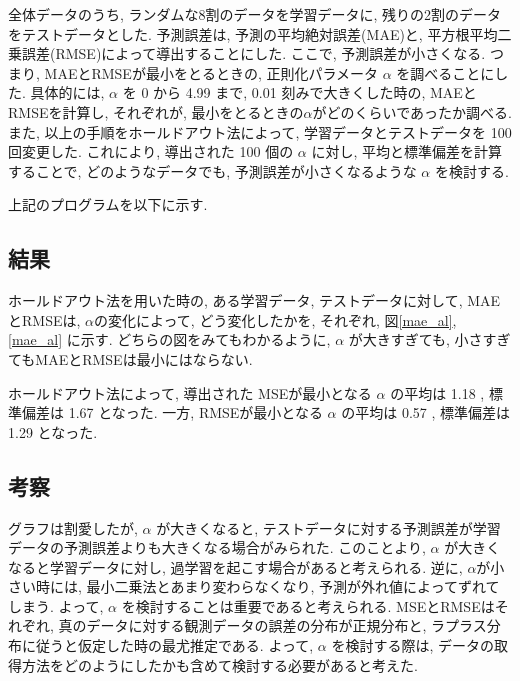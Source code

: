\documentclass{jsarticle}
\begin{document}
全体データのうち, ランダムな8割のデータを学習データに, 残りの2割のデータをテストデータとした.
予測誤差は, 予測の平均絶対誤差(MAE)と, 平方根平均二乗誤差(RMSE)によって導出することにした.
ここで, 予測誤差が小さくなる. つまり, MAEとRMSEが最小をとるときの, 正則化パラメータ $\alpha$ を調べることにした.
具体的には, $\alpha$ を 0 から 4.99 まで, 0.01 刻みで大きくした時の, MAEとRMSEを計算し, それぞれが, 最小をとるときの$\alpha$がどのくらいであったか調べる.
また, 以上の手順をホールドアウト法によって, 学習データとテストデータを 100 回変更した.
これにより, 導出された 100 個の $\alpha$ に対し, 平均と標準偏差を計算することで, どのようなデータでも, 予測誤差が小さくなるような $\alpha$ を検討する. 

上記のプログラムを以下に示す. 

\subsection{結果}
ホールドアウト法を用いた時の, ある学習データ, テストデータに対して, MAEとRMSEは, $\alpha$の変化によって, どう変化したかを, それぞれ, 図\ref{mae_al}, \ref{mae_al} に示す.
どちらの図をみてもわかるように, $\alpha$ が大きすぎても, 小さすぎてもMAEとRMSEは最小にはならない. 

ホールドアウト法によって, 導出された MSEが最小となる $\alpha$ の平均は 1.18 , 
標準偏差は 1.67 となった.
一方, RMSEが最小となる $\alpha$ の平均は 0.57 , 標準偏差は 1.29 となった. 


\subsection{考察}
グラフは割愛したが, $\alpha$ が大きくなると, テストデータに対する予測誤差が学習データの予測誤差よりも大きくなる場合がみられた.
このことより, $\alpha$ が大きくなると学習データに対し, 過学習を起こす場合があると考えられる.
逆に, $\alpha$が小さい時には, 最小二乗法とあまり変わらなくなり, 予測が外れ値によってずれてしまう.
よって, $\alpha$ を検討することは重要であると考えられる. 
MSEとRMSEはそれぞれ, 真のデータに対する観測データの誤差の分布が正規分布と, ラプラス分布に従うと仮定した時の最尤推定である.
よって, $\alpha$ を検討する際は, データの取得方法をどのようにしたかも含めて検討する必要があると考えた. 
\end{document}
